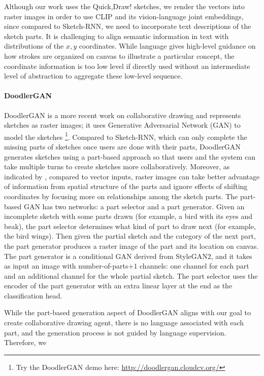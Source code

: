 Although our work uses the Quick,Draw! sketches, we render the vectors into raster images in order to use CLIP and its vision-language joint embeddings, since compared to Sketch-RNN, we need to incorporate text descriptions of the sketch parts.
It is challenging to align semantic information in text with distributions of the $x,y$ coordinates. While language gives high-level guidance on how strokes are organized on canvas to illustrate a particular concept, the coordinate information is too low level if directly used without an intermediate level of abstraction to aggregate these low-level sequence.    

\paragraph{DoodlerGAN} 
DoodlerGAN \citep{doodlerGAN} is a more recent work on collaborative drawing and represents sketches as raster images; it uses Generative Adversarial Network (GAN) to model the sketches \footnote{Try the DoodlerGAN demo here: \url{http://doodlergan.cloudcv.org/}}. Compared to Sketch-RNN, which can only complete the missing parts of sketches once users are done with their parts, DoodlerGAN generates sketches using a part-based approach so that users and the system can take multiple turns to create sketches more collaboratively. 
Moreover, as indicated by \cite{doodlerGAN}, compared to vector inputs, raster images can take better advantage of information from spatial structure of the parts and ignore effects of shifting coordinates by focusing more on relationships among the sketch parts.   
The part-based GAN has two networks: a part selector and a part generator. Given an incomplete sketch with some parts drawn (for example, a bird with its eyes and beak), the part selector determines what kind of part to draw next (for example, the bird wings). Then given the partial sketch and the category of the next part, the part generator produces a raster image of the part and its location on canvas. 
The part generator is a conditional GAN derived from StyleGAN2, and it takes as input an image with number-of-parts$+1$ channels: one channel for each part and an additional channel for the whole partial sketch. The part selector uses the encoder of the part generator with an extra linear layer at the end as the classification head. 

While the part-based generation aspect of DoodlerGAN aligns with our goal to create collaborative drawing agent, there is no language associated with each part, and the generation process is not guided by language supervision. Therefore, we 

